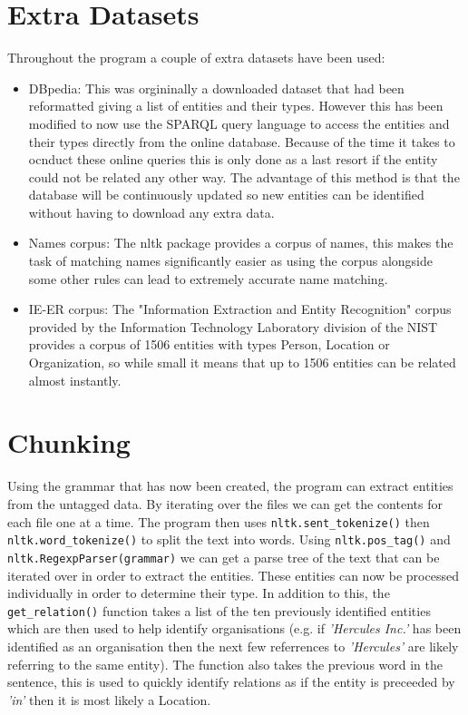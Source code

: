 \documentclass[draft]{article}
\begin{document}
\begin{multicols*}{2}
\section*{Extra Datasets}
Throughout the program a couple of extra datasets have been used:
\begin{itemize}
\item DBpedia: This was orgininally a downloaded dataset that had been reformatted giving a list of entities and their types. However this has been modified to now use the SPARQL query language to access the entities and their types directly from the online database. Because of the time it takes to ocnduct these online queries this is only done as a last resort if the entity could not be related any other way. The advantage of this method is that the database will be continuously updated so new entities can be identified without having to download any extra data.
\item Names corpus: The nltk package provides a corpus of names, this makes the task of matching names significantly easier as using the corpus alongside some other rules can lead to extremely accurate name matching.
\item IE-ER corpus: The "Information Extraction and Entity Recognition" corpus provided by the Information Technology Laboratory division of the NIST provides a corpus of 1506 entities with types Person, Location or Organization, so while small it means that up to 1506 entities can be related almost instantly.
\end{itemize}

\section*{Chunking}
Using the grammar that has now been created, the program can extract entities from the untagged data. By iterating over the files we can get the contents for each file one at a time. The program then uses \texttt{nltk.sent\_tokenize()} then \texttt{nltk.word\_tokenize()} to split the text into words. Using \texttt{nltk.pos\_tag()} and \texttt{nltk.RegexpParser(grammar)} we can get a parse tree of the text that can be iterated over in order to extract the entities. These entities can now be processed individually in order to determine their type. In addition to this, the \texttt{get\_relation()} function takes a list of the ten previously identified entities which are then used to help identify organisations (e.g. if \textit{'Hercules Inc.'} has been identified as an organisation then the next few referrences to \textit{'Hercules'} are likely referring to the same entity). The function also takes the previous word in the sentence, this is used to quickly identify relations as if the entity is preceeded by \textit{'in'} then it is most likely a Location.


\end{multicols*}
\end{document}
